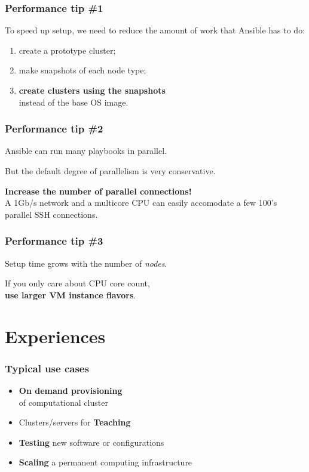 \documentclass[english,serif,mathserif,usenames,dvipsnames]{beamer}
\begin{document}
\begin{frame}
  \frametitle{Performance tip \#1}

  To speed up setup, we need to reduce the amount of work that
  Ansible has to do:
  \begin{enumerate}
  \item create a prototype cluster;
  \item make snapshots of each node type;
  \item \textbf{create clusters using the snapshots}
    \\ instead of the base OS image.
  \end{enumerate}

\end{frame}


\begin{frame}
  \frametitle{Performance tip \#2}

  Ansible can run many playbooks in parallel.

  \+
  But the default degree of parallelism is very conservative.

  \+
  \textbf{Increase the number of parallel connections!} \\
  A 1Gb/s network and a multicore CPU can easily accomodate a few 100's parallel
  SSH connections.
\end{frame}


\begin{frame}
  \frametitle{Performance tip \#3}

  Setup time grows with the number of \emph{nodes}.

  \+
  If you only care about CPU core count, \\
  \textbf{use larger VM instance flavors}.
\end{frame}


\section{Experiences}
\begin{frame}
  \frametitle{Typical use cases}
  \begin{itemize}
  \item \textbf{On demand provisioning} \\ of computational cluster
  \item Clusters/servers for \textbf{Teaching}
  \item \textbf{Testing} new software or configurations
  \item \textbf{Scaling} a permanent computing infrastructure
  \end{itemize}
\end{frame}
\end{document}
